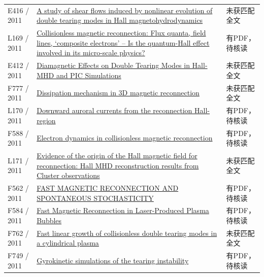 \documentclass[UTF8,a4paper,11pt,openany,fontset=fandol]{ctexbook}
\begin{document}
\begin{longtable}{P{24mm}P{97mm}P{27mm}}
E416 / 2011 & \href{https://doi.org/10.1140/epjd/e2011-20106-4}{A study of shear flows induced by nonlinear evolution of double tearing modes in Hall magnetohydrodynamics} & 未获匹配全文\\

L169 / 2011 & \href{https://doi.org/10.48550/arxiv.1103.1076}{Collisionless magnetic reconnection: Flux quanta,  field lines,  `composite electrons' -- Is the quantum-Hall effect involved in its micro-scale physics?} & 有PDF，待核读\\

E412 / 2011 & \href{https://ui.adsabs.harvard.edu/abs/2011APS..DPPNP9019A/abstract}{Diamagnetic Effects on Double Tearing Modes in Hall-MHD and PIC Simulations} & 未获匹配全文\\

F777 / 2011 & \href{https://doi.org/10.1063/1.3642609}{Dissipation mechanism in 3D magnetic reconnection} & 未获匹配全文\\

L170 / 2011 & \href{https://doi.org/10.5194/angeo-29-679-2011}{Downward auroral currents from the reconnection Hall-region} & 有PDF，待核读\\

F588 / 2011 & \href{https://doi.org/10.1007/s11434-011-4440-0}{Electron dynamics in collisionless magnetic reconnection} & 有PDF，待核读\\

L171 / 2011 & \href{https://doi.org/10.1029/2011ja016991}{Evidence of the origin of the Hall magnetic field for reconnection: Hall MHD reconstruction results from Cluster observations} & 未获匹配全文\\

F562 / 2011 & \href{https://doi.org/10.1088/0004-637x/743/1/51}{FAST MAGNETIC RECONNECTION AND SPONTANEOUS STOCHASTICITY} & 有PDF，待核读\\

F584 / 2011 & \href{https://doi.org/10.1103/physrevlett.106.215003}{Fast Magnetic Reconnection in Laser-Produced Plasma Bubbles} & 有PDF，待核读\\

F762 / 2011 & \href{https://doi.org/10.1088/0029-5515/51/3/033003}{Fast linear growth of collisionless double tearing modes in a cylindrical plasma} & 未获匹配全文\\

F749 / 2011 & \href{https://doi.org/10.1063/1.3659035}{Gyrokinetic simulations of the tearing instability} & 有PDF，待核读\\


\end{longtable}
\end{document}
